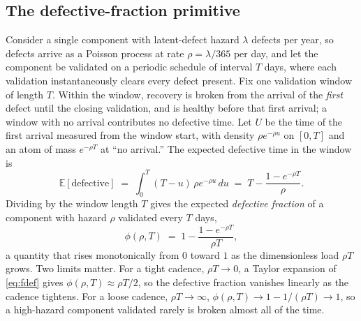 \documentclass[journal]{IEEEtran}
\begin{document}
\subsection{The defective-fraction primitive}
Consider a single component with latent-defect hazard $\lambda$ defects per year, so defects arrive
as a Poisson process at rate $\rho = \lambda/365$ per day, and let the component be validated on a
periodic schedule of interval $T$ days, where each validation instantaneously clears every defect
present. Fix one validation window of length $T$. Within the window, recovery is broken from the
arrival of the \emph{first} defect until the closing validation, and is healthy before that first
arrival; a window with no arrival contributes no defective time. Let $U$ be the time of the first
arrival measured from the window start, with density $\rho e^{-\rho u}$ on $[0, T]$ and an atom of
mass $e^{-\rho T}$ at ``no arrival.'' The expected defective time in the window is
\begin{equation}
\label{eq:expdef}
\mathbb{E}[\text{defective}] \;=\; \int_{0}^{T} (T-u)\,\rho e^{-\rho u}\, du \;=\; T - \frac{1 - e^{-\rho T}}{\rho}.
\end{equation}
Dividing by the window length $T$ gives the expected \emph{defective fraction} of a component with
hazard $\rho$ validated every $T$ days,
\begin{equation}
\label{eq:fdef}
\phi(\rho, T) \;=\; 1 - \frac{1 - e^{-\rho T}}{\rho T},
\end{equation}
a quantity that rises monotonically from $0$ toward $1$ as the dimensionless load $\rho T$ grows. Two
limits matter. For a tight cadence, $\rho T \to 0$, a Taylor expansion of \eqref{eq:fdef} gives
$\phi(\rho, T) \approx \rho T / 2$, so the defective fraction vanishes linearly as the cadence
tightens. For a loose cadence, $\rho T \to \infty$, $\phi(\rho, T) \to 1 - 1/(\rho T) \to 1$, so a
high-hazard component validated rarely is broken almost all of the time.
\end{document}
